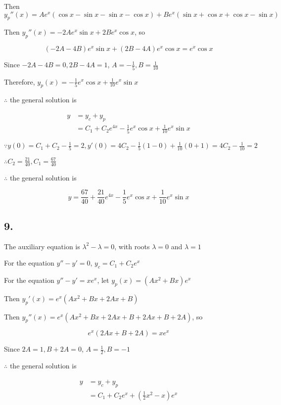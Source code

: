 \documentclass{article}
\begin{document}
  Then $y_p ''(x) = Ae^x (\cos x - \sin x - \sin x - \cos x) + Be^x (\sin x + \cos x + \cos x - \sin x)$

  Then $y_p'' (x) = -2Ae^x \sin x + 2Be^x \cos x$, so

  $$(-2A - 4B)e^x \sin x + (2B - 4A)e^x \cos x  = e^x \cos x$$

  Since $-2A - 4B = 0, 2B - 4A = 1$, $A = -\frac{1}{5}, B = \frac{1}{10}$

  Therefore, $y_p(x) = -\frac{1}{5}e^x \cos x + \frac{1}{10}e^x \sin x$

  $\therefore$ the general solution is

  $$\begin{aligned}
    y &= y_c + y_p \\
      &= C_1 + C_2 e^{4x} -\frac{1}{5}e^x \cos x + \frac{1}{10}e^x \sin x
  \end{aligned}
  $$

  $\because y(0) = C_1 + C_2 - \frac{1}{5} = 2, y'(0) = 4C_2 - \frac{1}{5}(1-0) + \frac{1}{10}(0+1) = 4C_2 - \frac{1}{10} = 2$

  $\therefore C_2 = \frac{21}{40}, C_1 = \frac{67}{40}$

  $\therefore$ the general solution is

  $$y = \frac{67}{40} + \frac{21}{40}e^{4x} - \frac{1}{5}e^x \cos x + \frac{1}{10}e^x \sin x$$

  \subsection*{9. }

  The auxiliary equation is $\lambda^2 - \lambda = 0$, with roots $\lambda = 0$ and $\lambda = 1$

  For the equation $y'' - y' = 0$, $y_c = C_1 + C_2e^x$

  For the equation $y'' - y' = xe^x$, let $y_p(x) = (Ax^2 + Bx)e^x$

  Then $y_p'(x) = e^x (Ax^2 + Bx + 2Ax + B)$

  Then $y_p''(x) = e^x(Ax^2 + Bx + 2Ax + B + 2Ax + B + 2A)$, so

  $$e^x(2Ax + B + 2A) = xe^x$$

  Since $2A = 1, B + 2A = 0$, $A = \frac{1}{2}, B = -1$

  $\therefore$ the general solution is

  $$\begin{aligned}
    y &= y_c + y_p \\
      &= C_1 + C_2 e^x + (\frac{1}{2}x^2 - x)e^x
  \end{aligned}
  $$
\end{document}
